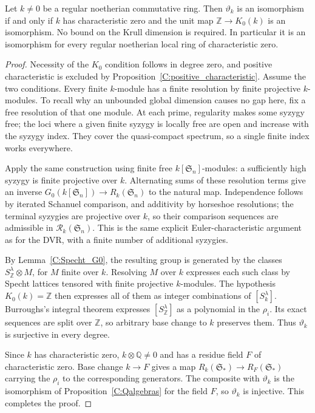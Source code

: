 \begin{theorem}
\label{C:regular_noetherian}
Let $k\ne0$ be a regular noetherian commutative ring. Then
$\vartheta_k$ is an isomorphism if and only if $k$ has characteristic zero
and the unit map $\mathbb Z\to K_0(k)$ is an isomorphism. No bound on the
Krull dimension is required. In particular it is an isomorphism for every
regular noetherian local ring of characteristic zero.
\end{theorem}
\begin{proof}
Necessity of the $K_0$ condition follows in degree zero, and positive
characteristic is excluded by Proposition~\ref{C:positive_characteristic}.
Assume the two conditions. Every finite $k$-module has a finite resolution
by finite projective $k$-modules. To recall why an unbounded global dimension
causes no gap here, fix a free resolution of that one module. At each prime,
regularity makes some syzygy free; the loci where a given finite syzygy is
locally free are open and increase with the syzygy index. They cover the
quasi-compact spectrum, so a single finite index works everywhere.

Apply the same construction using finite free $k[\mathfrak S_n]$-modules:
a sufficiently high syzygy is finite projective over $k$. Alternating sums
of these resolution terms give an inverse
$G_0(k[\mathfrak S_n])\to R_k(\mathfrak S_n)$ to the natural map.
Independence follows by iterated Schanuel comparison, and additivity by
horseshoe resolutions; the terminal syzygies are projective over $k$, so
their comparison sequences are admissible in $\mathcal R_k(\mathfrak S_n)$.
This is the same explicit Euler-characteristic argument as for the DVR,
with a finite number of additional syzygies.

By Lemma~\ref{C:Specht_G0}, the resulting group is generated by the classes
$S^\lambda_{\mathbb Z}\otimes M$, for $M$ finite over $k$. Resolving $M$
over $k$ expresses each such class by Specht lattices tensored with finite
projective $k$-modules. The hypothesis $K_0(k)=\mathbb Z$ then expresses
all of them as integer combinations of $[S^\lambda_k]$.
Burroughs's integral theorem expresses $[S^\lambda_{\mathbb Z}]$ as a
polynomial in the $\rho_i$. Its exact sequences are split over $\mathbb Z$,
so arbitrary base change to $k$ preserves them. Thus $\vartheta_k$ is
surjective in every degree.

Since $k$ has characteristic zero, $k\otimes\mathbb Q\ne0$ and has a
residue field $F$ of characteristic zero. Base change $k\to F$ gives a
map $R_k(\mathfrak S_*)\to R_F(\mathfrak S_*)$ carrying the $\rho_i$ to
the corresponding generators. The composite with $\vartheta_k$ is the
isomorphism of Proposition~\ref{C:Qalgebras} for the field $F$, so
$\vartheta_k$ is injective. This completes the proof.
\end{proof}

